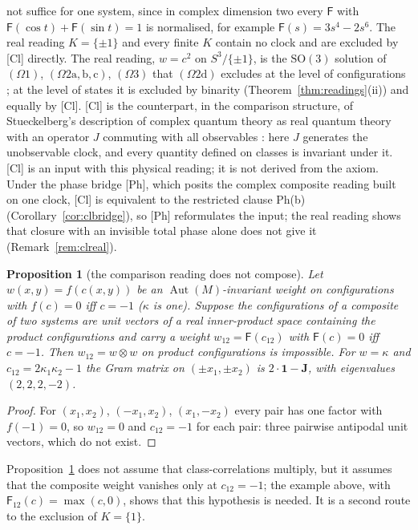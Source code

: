 \documentclass[aps,pra,onecolumn,superscriptaddress,nofootinbib,10pt]{revtex4-2}
\newtheorem{proposition}[theorem]{Proposition}
\theoremstyle{definition}
\theoremstyle{remark}
\newcommand{\Aut}{\operatorname{Aut}}
\newcommand{\SO}{\mathrm{SO}}
\begin{document}
not suffice for one system, since in complex dimension two every $\mathsf F$ with $\mathsf F(\cos t)+\mathsf F(\sin t)=1$
is normalised, for example $\mathsf F(s)=3s^4-2s^6$.  The real reading $K=\{\pm1\}$ and every finite $K$ contain no clock and are excluded by [Cl]
directly.  The real reading, $w=c^2$ on $S^3/\{\pm1\}$, is the $\SO(3)$ solution of $(\Omega1)$, $(\Omega2\mathrm{a,b,c})$,
$(\Omega3)$ that $(\Omega2\mathrm d)$ excludes at the level of configurations \cite[Rem.~3.13]{PaperI}; at the level of
states it is excluded by binarity (Theorem~\ref{thm:readings}(ii)) and equally by [Cl].  [Cl] is the counterpart, in the comparison structure, of Stueckelberg's description of complex
quantum theory as real quantum theory with an operator $J$ commuting with all observables
\cite{Stueckelberg}: here $J$ generates the unobservable clock, and every quantity defined on classes is
invariant under it.  [Cl] is an input with this physical reading; it is not derived from the axiom.
Under the phase bridge [Ph], which posits the complex composite reading built on one clock, [Cl] is
equivalent to the restricted clause Ph(b) (Corollary~\ref{cor:clbridge}), so [Ph] reformulates the input; the real reading
shows that closure with an invisible total phase alone does not give it (Remark~\ref{rem:clreal}).

\begin{proposition}[the comparison reading does not compose]\label{prop:nogo}
Let $w(x,y)=f(c(x,y))$ be an $\Aut(M)$-invariant weight on configurations with $f(c)=0$ iff $c=-1$ ($\kappa$ is
one).  Suppose the configurations of a composite of two systems are unit vectors of a real
inner-product space containing the product configurations and carry a weight $w_{12}=\mathsf F(c_{12})$ with
$\mathsf F(c)=0$ iff $c=-1$.  Then $w_{12}=w\otimes w$ on product configurations is impossible.  For $w=\kappa$ and
$c_{12}=2\kappa_1\kappa_2-1$ the Gram matrix on $(\pm x_1,\pm x_2)$ is $2\cdot\mathbf1-\mathbf J$, with eigenvalues
$(2,2,2,-2)$.
\end{proposition}
\begin{proof}
For $(x_1,x_2)$, $(-x_1,x_2)$, $(x_1,-x_2)$ every pair has one factor with $f(-1)=0$, so $w_{12}=0$ and
$c_{12}=-1$ for each pair: three pairwise antipodal unit vectors, which do not exist.
\end{proof}
Proposition~\ref{prop:nogo} does not assume that class-correlations multiply, but it assumes that the
composite weight vanishes only at $c_{12}=-1$; the example above, with $\mathsf F_{12}(c)=\max(c,0)$, shows that this
hypothesis is needed.  It is a second route to
the exclusion of $K=\{1\}$.
\end{document}
